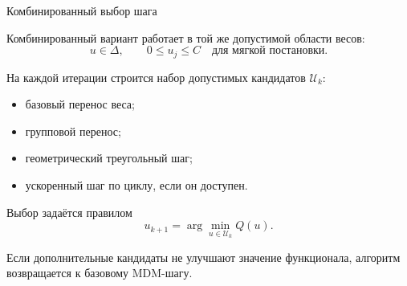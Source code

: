 \SPBGContentSlide
  {Комбинированный выбор шага}
  {%
    \SmallBody
    Комбинированный вариант работает в той же допустимой области весов:
    \[
      u\in\Delta,\qquad
      0\le u_j\le C \quad \text{для мягкой постановки}.
    \]

    На каждой итерации строится набор допустимых кандидатов
    \(\mathcal U_k\):

    \vspace{.12cm}
    \begin{itemize}
      \item базовый перенос веса;
      \item групповой перенос;
      \item геометрический треугольный шаг;
      \item ускоренный шаг по циклу, если он доступен.
    \end{itemize}

    \vspace{.12cm}
    Выбор задаётся правилом
    \[
      u_{k+1}=\arg\min_{u\in\mathcal U_k}Q(u).
    \]

    Если дополнительные кандидаты не улучшают значение функционала,
    алгоритм возвращается к базовому MDM-шагу.
  }
